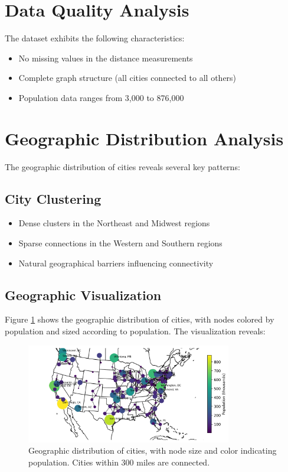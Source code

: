 \section{Data Quality Analysis}
The dataset exhibits the following characteristics:
\begin{itemize}
    \item No missing values in the distance measurements
    \item Complete graph structure (all cities connected to all others)
    \item Population data ranges from 3,000 to 876,000
\end{itemize}

\section{Geographic Distribution Analysis}
The geographic distribution of cities reveals several key patterns:

\subsection{City Clustering}
\begin{itemize}
    \item Dense clusters in the Northeast and Midwest regions
    \item Sparse connections in the Western and Southern regions
    \item Natural geographical barriers influencing connectivity
\end{itemize}

\subsection{Geographic Visualization}
Figure \ref{fig:geo_dist} shows the geographic distribution of cities, with nodes colored by population and sized according to population. The visualization reveals:

\begin{figure}[H]
    \centering
    \includegraphics[width=0.8\textwidth]{figures/geographic_distribution.png}
    \caption{Geographic distribution of cities, with node size and color indicating population. Cities within 300 miles are connected.}
    \label{fig:geo_dist}
\end{figure}

